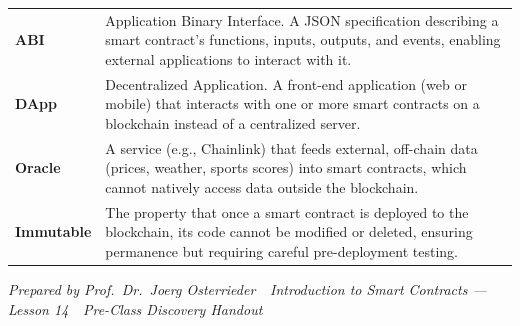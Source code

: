 \documentclass[11pt,a4paper]{article}
\begin{document}
\begin{tabular}{@{}p{3.6cm}p{11.0cm}@{}}
\textbf{ABI}              & Application Binary Interface. A JSON specification describing a smart contract's functions, inputs, outputs, and events, enabling external applications to interact with it. \\
\textbf{DApp}             & Decentralized Application. A front-end application (web or mobile) that interacts with one or more smart contracts on a blockchain instead of a centralized server. \\
\textbf{Oracle}           & A service (e.g., Chainlink) that feeds external, off-chain data (prices, weather, sports scores) into smart contracts, which cannot natively access data outside the blockchain. \\
\textbf{Immutable}        & The property that once a smart contract is deployed to the blockchain, its code cannot be modified or deleted, ensuring permanence but requiring careful pre-deployment testing. \\
\bottomrule
\end{tabular}

\vspace{6pt}
\noindent\textcolor{mlgray}{\small\textit{Prepared by Prof.\ Dr.\ Joerg Osterrieder \,\textbullet\, Introduction to Smart Contracts --- Lesson 14 \,\textbullet\, Pre-Class Discovery Handout}}
\end{document}
